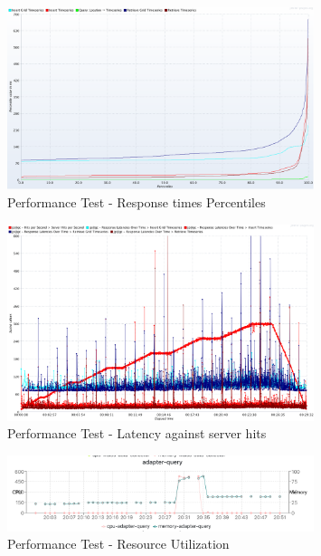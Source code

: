 \begin{figure}[htp]
    \centering
    \includegraphics[width=0.8\textwidth]{results/obs/all/obs_all_15m_response_times_percentiles.png}
    \caption{Performance Test - Response times Percentiles}
    \label{fi:test_obs_all_15m_latency_percentile}
\end{figure}

\begin{figure}[htp]
    \centering
    \includegraphics[width=0.8\textwidth]{results/obs/all/obs_all_15m_res_latencies_against_hits.png}
    \caption{Performance Test - Latency against server hits}
    \label{fi:test_obs_all_15m_latency}
\end{figure}

\begin{figure}[htp]
    \centering
    \includegraphics[width=0.8\textwidth]{results/obs/all/obs_all_15m_resource_utilization.png}
    \caption{Performance Test - Resource Utilization}
    \label{fi:test_obs_all_15m_resources}
\end{figure}


